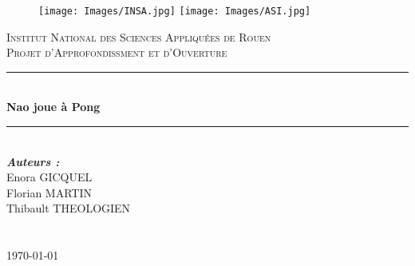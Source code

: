 \documentclass[a4paper,12pt]{article}
\begin{document}
\begin{titlepage}
\thispagestyle{empty}
\begin{figure}
	\texttt{[image: Images/INSA.jpg]}\hfill
	\texttt{[image: Images/ASI.jpg]}\
\end{figure}

\newcommand{\HRule}{\rule{\linewidth}{0.5mm}}
\center
{}\textsc{\huge Institut National des Sciences Appliqu\'{e}es de Rouen}\\[1.5cm]
\textsc{\Large Projet d'Approfondissment et d'Ouverture}\\[2cm]

\HRule \\[0.4cm]
{ \huge \bfseries Nao joue à Pong}\\[0.2cm]
\HRule \\[2.5cm]



\large \emph{\textbf{Auteurs :}}\\
	Enora GICQUEL\\
	Florian MARTIN\\
	Thibault THEOLOGIEN \\

~\\ ~\\[1cm]

\vfill{\today}\\[3cm]

\end{titlepage}

	\pagebreak
	\tableofcontents
	\pagebreak

	
	
	
	
	
	
	
	
	
	
\end{document}
